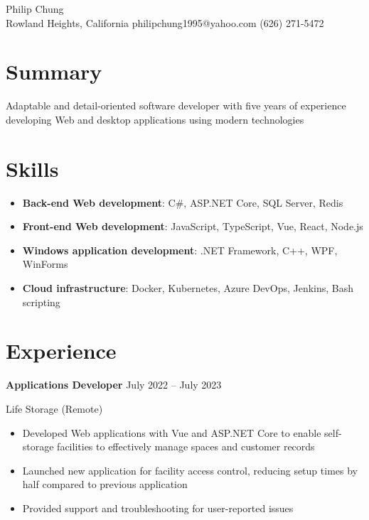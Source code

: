 \documentclass[12pt]{article}
\newcommand{\titleheader}[2]{\textbf{#1} \symbol{"B7} #2}
\newcommand{\locheader}[2]{#1 (#2)}
\begin{document}
	\begin{center}
		{ Philip Chung} \\ \vspace{0.5em}
		Rowland Heights, California  philipchung1995@yahoo.com  (626) 271-5472
	\end{center}

	\section*{Summary}

	Adaptable and detail-oriented software developer with five years of experience developing Web and desktop applications using modern technologies

	\section*{Skills}

	\newcommand{\skillitem}[2]{\item \textbf{#1}: #2}

	\begin{itemize}
		\skillitem{Back-end Web development}{C\#, ASP.NET Core, SQL Server, Redis}
		\skillitem{Front-end Web development}{JavaScript, TypeScript, Vue, React, Node.js}
		\skillitem{Windows application development}{.NET Framework, C++, WPF, WinForms}
		\skillitem{Cloud infrastructure}{Docker, Kubernetes, Azure DevOps, Jenkins, Bash scripting}
	\end{itemize}

	\section*{Experience}

	\titleheader{Applications Developer}{July 2022 -- July 2023}

	\locheader{Life Storage}{Remote}

	\begin{itemize}
		\item Developed Web applications with Vue and ASP.NET Core to enable self-storage facilities to effectively manage spaces and customer records
		\item Launched new application for facility access control, reducing setup times by half compared to previous application
		\item Provided support and troubleshooting for user-reported issues
	\end{itemize}
\end{document}
